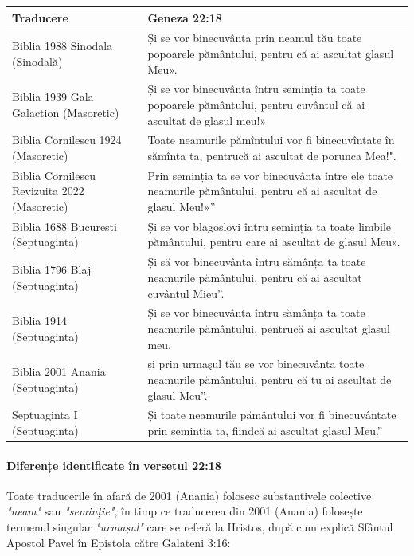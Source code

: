 \documentclass[12pt,a4paper]{article}
\begin{document}
\begin{longtable}{|p{3cm}|L|}
    \hline
    \textbf{Traducere}                           & \textbf{Geneza 22:18}                                                                                              \\
    \hline
    Biblia 1988 Sinodala (Sinodală)              & Și se vor binecuvânta prin neamul tău toate popoarele pământului, pentru că ai ascultat glasul Meu».               \\
    \hline
    Biblia 1939 Gala Galaction (Masoretic)       & Și se vor binecuvânta întru seminția ta toate popoarele pământului, pentru cuvântul că ai ascultat de glasul meu!» \\
    \hline
    Biblia Cornilescu 1924 (Masoretic)           & Toate neamurile pămîntului vor fi binecuvîntate în sămînța ta, pentrucă ai ascultat de porunca Mea!".              \\
    \hline
    Biblia Cornilescu Revizuita 2022 (Masoretic) & Prin seminția ta se vor binecuvânta între ele
    toate neamurile pământului,
    pentru că ai ascultat de glasul Meu!»”                                                                                                                            \\
    \hline
    Biblia 1688 Bucuresti (Septuaginta)          & Și se vor blagoslovi întru seminția ta toate limbile pământului, pentru care ai ascultat de glasul Meu».           \\
    \hline
    Biblia 1796 Blaj (Septuaginta)               & Și să vor binecuvânta întru sămânța ta toate neamurile pământului, pentru că ai ascultat cuvântul Mieu”.           \\
    \hline
    Biblia 1914 (Septuaginta)                    & Și se vor binecuvânta întru sămânța ta toate neamurile pământului, pentrucă ai ascultat glasul meu.                \\
    \hline
    Biblia 2001 Anania (Septuaginta)             & și prin urmaşul tău se vor binecuvânta toate neamurile pământului, pentru că tu ai ascultat de glasul Meu”.        \\
    \hline
    Septuaginta I (Septuaginta)                  & Și toate neamurile pământului vor fi binecuvântate prin seminția ta, fiindcă ai ascultat glasul Meu.”              \\
    \hline
\end{longtable}

\paragraph{Diferențe identificate în versetul 22:18}
Toate traducerile în afară de 2001 (Anania) folosesc substantivele colective \emph{"neam"} sau \emph{"seminție"}, în timp ce traducerea din 2001 (Anania) folosește termenul singular \emph{"urmașul"} care se referă la Hristos, după cum explică Sfântul Apostol Pavel în Epistola către Galateni 3:16:
\end{document}
